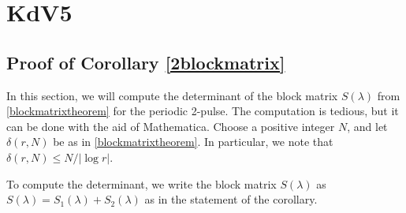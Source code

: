 \documentclass[thesis.tex]{subfiles}
\begin{document}
\iffulldocument\else
	\chapter{KdV5}
\fi

\section{Proof of Corollary \ref{2blockmatrix}}

In this section, we will compute the determinant of the block matrix $S(\lambda)$ from \cref{blockmatrixtheorem} for the periodic 2-pulse. The computation is tedious, but it can be done with the aid of Mathematica. Choose a positive integer $N$, and let $\delta(r, N)$ be as in \cref{blockmatrixtheorem}. In particular, we note that $\delta(r,N) \leq N/|\log r|$. 

To compute the determinant, we write the block matrix $S(\lambda)$ as $S(\lambda) = S_1(\lambda) + S_2(\lambda)$ as in the statement of the corollary.
\end{document}
